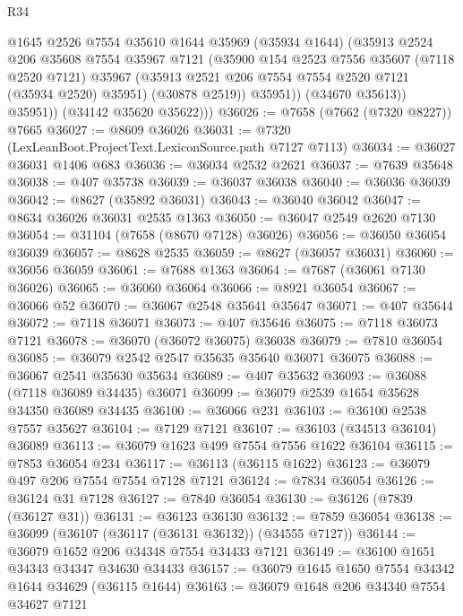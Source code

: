\begin{lexlean}{R34}
\begin{coremodule}
                @1645
                @2526
                @7554
                @35610
                @1644
                @35969
                (@35934 @1644)
                (@35913
                  @2524
                  @206
                  @35608
                  @7554
                  @35967
                  @7121
                  (@35900
                    @154
                    @2523
                    @7556
                    @35607
                    (@7118 @2520 @7121)
                    @35967
                    (@35913 @2521 @206 @7554 @7554 @2520 @7121 (@35934 @2520) @35951)
                    (@30878 @2519))
                  @35951))
              (@34670 @35613))
            @35951))
        (@34142 @35620 @35622)))
@36026 := @7658 (@7662 (@7320 @8227)) @7665
@36027 := @8609 @36026
@36031 := @7320 (LexLeanBoot.ProjectText.LexiconSource.path @7127 @7113)
@36034 := @36027 @36031 @1406 @683
@36036 := @36034 @2532 @2621
@36037 := @7639 @35648
@36038 := @407 @35738
@36039 := @36037 @36038
@36040 := @36036 @36039
@36042 := @8627 (@35892 @36031)
@36043 := @36040 @36042
@36047 := @8634 @36026 @36031 @2535 @1363
@36050 := @36047 @2549 @2620 @7130
@36054 := @31104 (@7658 (@8670 @7128) @36026)
@36056 := @36050 @36054 @36039
@36057 := @8628 @2535
@36059 := @8627 (@36057 @36031)
@36060 := @36056 @36059
@36061 := @7688 @1363
@36064 := @7687 (@36061 @7130 @36026)
@36065 := @36060 @36064
@36066 := @8921 @36054
@36067 := @36066 @52
@36070 := @36067 @2548 @35641 @35647
@36071 := @407 @35644
@36072 := @7118 @36071
@36073 := @407 @35646
@36075 := @7118 @36073 @7121
@36078 := @36070 (@36072 @36075) @36038
@36079 := @7810 @36054
@36085 := @36079 @2542 @2547 @35635 @35640 @36071 @36075
@36088 := @36067 @2541 @35630 @35634
@36089 := @407 @35632
@36093 := @36088 (@7118 @36089 @34435) @36071
@36099 := @36079 @2539 @1654 @35628 @34350 @36089 @34435
@36100 := @36066 @231
@36103 := @36100 @2538 @7557 @35627
@36104 := @7129 @7121
@36107 := @36103 (@34513 @36104) @36089
@36113 := @36079 @1623 @499 @7554 @7556 @1622 @36104
@36115 := @7853 @36054 @234
@36117 := @36113 (@36115 @1622)
@36123 := @36079 @497 @206 @7554 @7554 @7128 @7121
@36124 := @7834 @36054
@36126 := @36124 @31 @7128
@36127 := @7840 @36054
@36130 := @36126 (@7839 (@36127 @31))
@36131 := @36123 @36130
@36132 := @7859 @36054
@36138 := @36099 (@36107 (@36117 (@36131 @36132)) (@34555 @7127))
@36144 := @36079 @1652 @206 @34348 @7554 @34433 @7121
@36149 := @36100 @1651 @34343 @34347 @34630 @34433
@36157 := @36079 @1645 @1650 @7554 @34342 @1644 @34629 (@36115 @1644)
@36163 := @36079 @1648 @206 @34340 @7554 @34627 @7121

\end{coremodule}
\end{lexlean}
